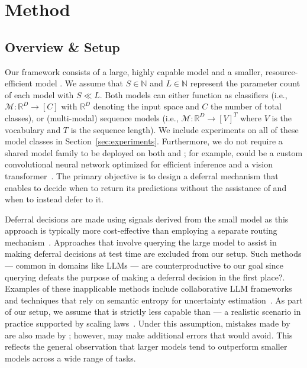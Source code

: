\section{Method}

\subsection{Overview \& Setup}

Our framework consists of a large, highly capable model \textbf{\bigmodel} and a smaller, resource-efficient model \textbf{\smallmodel}. We assume that $S \in \mathbb{N}$ and $L \in \mathbb{N}$ represent the parameter count of each model with $S \ll L$. Both models can either function as classifiers (i.e., $\mathcal{M}: \mathbb{R}^D \rightarrow [C]$ with $\mathbb{R}^D$ denoting the input space and $C$ the number of total classes), or (multi-modal) sequence models (i.e., $\mathcal{M}: \mathbb{R}^D \rightarrow [V]^{T}$ where $V$ is the vocabulary and $T$ is the sequence length). We include experiments on all of these model classes in Section~\ref{sec:experiments}. Furthermore, we do not require a shared model family to be deployed on both \smallmodel and \bigmodel; for example, \smallmodel could be a custom convolutional neural network optimized for efficient inference and \bigmodel a vision transformer~\citep{dosovitskiy2020image}. The primary objective is to design a deferral mechanism that enables \smallmodel to decide when to return its predictions without the assistance of \bigmodel and when to instead defer to it.

Deferral decisions are made using signals derived from the small model \smallmodel as this approach is typically more cost-effective than employing a separate routing mechanism~\citep{teerapittayanon2016branchynet}. Approaches that involve querying the large model \bigmodel to assist in making deferral decisions at test time are excluded from our setup. Such methods --- common in domains like LLMs --- are counterproductive to our goal since querying \bigmodel defeats the purpose of making a deferral decision in the first place?. Examples of these inapplicable methods include collaborative LLM frameworks~\citep{mielke2022reducing} and techniques that rely on semantic entropy for uncertainty estimation~\citep{kuhn2023semantic}. As part of our setup, we assume that \smallmodel is strictly less capable than \bigmodel --- a realistic scenario in practice supported by scaling laws~\citep{kaplan2020scaling}. Under this assumption, mistakes made by \bigmodel are also made by \smallmodel; however, \smallmodel may make additional errors that \bigmodel would avoid. This reflects the general observation that larger models tend to outperform smaller models across a wide range of tasks.

